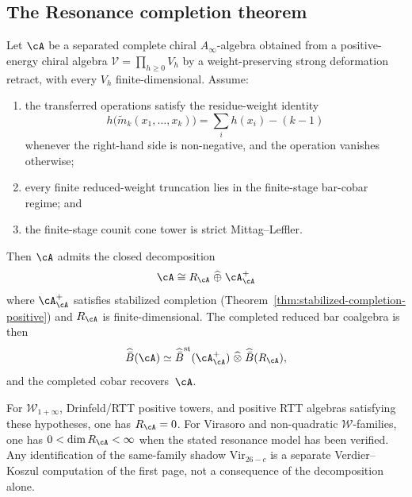 \subsection{The Resonance completion theorem}

\begin{theorem}
\label{thm:platonic-completion}%
%
%
Let $\cA$ be a separated complete chiral $A_\infty$-algebra obtained
from a positive-energy chiral algebra
$\mathcal V=\prod_{h\ge0}V_h$ by a weight-preserving strong
deformation retract, with every $V_h$ finite-dimensional.  Assume:
\begin{enumerate}
\item the transferred operations satisfy the residue-weight identity
 \[
 h\bigl(\tilde m_k(x_1,\ldots,x_k)\bigr)
 =
 \sum_i h(x_i)-(k-1)
 \]
 whenever the right-hand side is non-negative, and the operation
 vanishes otherwise;
\item every finite reduced-weight truncation lies in the finite-stage
 bar-cobar regime; and
\item the finite-stage counit cone tower is strict Mittag--Leffler.
\end{enumerate}
Then $\cA$ admits the closed decomposition
\[
\cA \cong R_\cA \;\widehat{\oplus}\; \cA^+_\cA
\]
where $\cA^+_\cA$ satisfies stabilized completion
\textup{(}Theorem~\textup{\ref{thm:stabilized-completion-positive})}
and $R_\cA$ is finite-dimensional. The completed reduced bar
coalgebra is then
\[
\widehat{\bar B}(\cA)
\simeq
\widehat{\bar B}^{\mathrm{st}}(\cA^+_\cA)
\;\widehat{\otimes}\;
\widehat{\bar B}(R_\cA),
\]
and the completed cobar recovers~$\cA$.

For $\mathcal{W}_{1+\infty}$, Drinfeld/RTT positive towers, and
positive RTT algebras satisfying these hypotheses, one has
$R_\cA = 0$.
For Virasoro and non-quadratic $\mathcal{W}$-families, one has
$0 < \dim R_\cA < \infty$ when the stated resonance model has been
verified.  Any identification of the same-family shadow
$\mathrm{Vir}_{26-c}$ is a separate Verdier--Koszul computation of
the first page, not a consequence of the decomposition alone.
\end{theorem}

